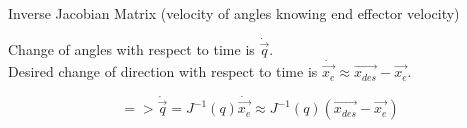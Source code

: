 \documentclass{article}
\begin{document}
\begin{center}
	{\Large Inverse Jacobian Matrix (velocity of angles knowing end effector velocity)}
\end{center}

{\large
\begin{center}
	Change of angles with respect to time is $\dot{\vec{q}}$. \\
	Desired change of direction with respect to time is $\dot{\vec{x_{e}}}\approx\vec{x_{des}}-\vec{x_{e}}$.
\end{center}
\[
=> \dot{\vec{q}}=J^{-1}(q)\dot{\vec{x_{e}}}\approx J^{-1}(q)(\vec{x_{des}}-\vec{x_{e}})
\]
}
\end{document}
